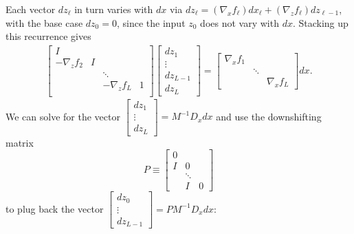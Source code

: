 \documentclass{article}
\begin{document}
Each vector $dz_\ell$ in turn varies with $dx$ via $dz_\ell = (\nabla_x f_\ell)
    dx_\ell + (\nabla_z f_\ell) dz_{\ell-1}$, with the base case $dz_0 = 0$, since
the input $z_0$ does not vary with $dx$. Stacking up this recurrence gives
\begin{align}
    \begin{bmatrix}
        I             &   &                   \\
        -\nabla_z f_2 & I &                   \\
                      &   & \ddots            \\
                      &   & -\nabla_z f_L & 1 \\
    \end{bmatrix}
    \begin{bmatrix}
        dz_1 \\ \vdots \\ dz_{L-1}  \\ dz_L
    \end{bmatrix}
    =
    \begin{bmatrix}
        \nabla_x f_1 &        &              \\
                     & \ddots &              \\
                     &        & \nabla_x f_L
    \end{bmatrix}
    dx.
\end{align}
We can solve for the vector $\begin{bmatrix}
        dz_1 \\ \vdots \\ dz_L
    \end{bmatrix}
    = M^{-1} D_x dx$ and use the downshifting matrix
\begin{equation}
    P \equiv \begin{bmatrix}
        0 \\ I & 0 \\ &\ddots \\ &I&0
    \end{bmatrix}
\end{equation}
to plug back the vector $\begin{bmatrix}
        dz_0 \\ \vdots \\ dz_{L-1}
    \end{bmatrix}
    =PM^{-1}D_x dx$:
\end{document}
